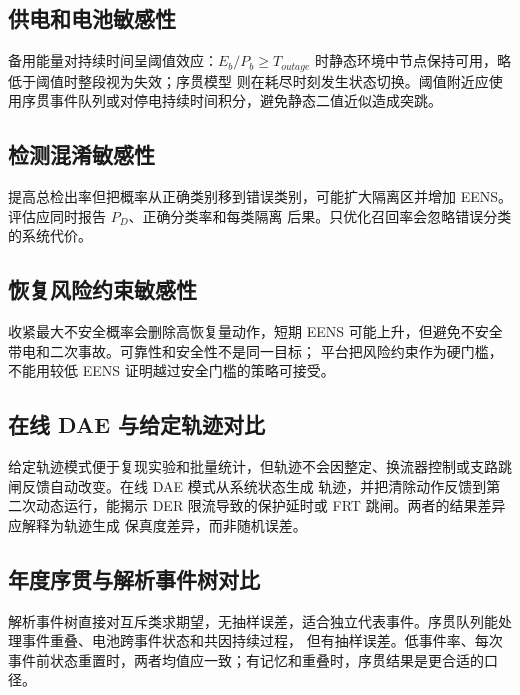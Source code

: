 \subsection{供电和电池敏感性}
备用能量对持续时间呈阈值效应：$E_b/P_b\ge T_{outage}$ 时静态环境中节点保持可用，略低于阈值时整段视为失效；序贯模型
则在耗尽时刻发生状态切换。阈值附近应使用序贯事件队列或对停电持续时间积分，避免静态二值近似造成突跳。

\subsection{检测混淆敏感性}
提高总检出率但把概率从正确类别移到错误类别，可能扩大隔离区并增加 EENS。评估应同时报告 $P_D$、正确分类率和每类隔离
后果。只优化召回率会忽略错误分类的系统代价。

\subsection{恢复风险约束敏感性}
收紧最大不安全概率会删除高恢复量动作，短期 EENS 可能上升，但避免不安全带电和二次事故。可靠性和安全性不是同一目标；
平台把风险约束作为硬门槛，不能用较低 EENS 证明越过安全门槛的策略可接受。

\subsection{在线 DAE 与给定轨迹对比}
给定轨迹模式便于复现实验和批量统计，但轨迹不会因整定、换流器控制或支路跳闸反馈自动改变。在线 DAE 模式从系统状态生成
轨迹，并把清除动作反馈到第二次动态运行，能揭示 DER 限流导致的保护延时或 FRT 跳闸。两者的结果差异应解释为轨迹生成
保真度差异，而非随机误差。

\subsection{年度序贯与解析事件树对比}
解析事件树直接对互斥类求期望，无抽样误差，适合独立代表事件。序贯队列能处理事件重叠、电池跨事件状态和共因持续过程，
但有抽样误差。低事件率、每次事件前状态重置时，两者均值应一致；有记忆和重叠时，序贯结果是更合适的口径。

